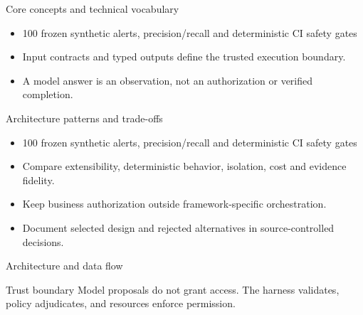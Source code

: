 \documentclass[aspectratio=169,10pt]{beamer}
\begin{document}
\begin{frame}{Core concepts and technical vocabulary}
\small
\begin{itemize}
\item 100 frozen synthetic alerts, precision/recall and deterministic CI safety gates
\item Input contracts and typed outputs define the trusted execution boundary.
\item A model answer is an observation, not an authorization or verified completion.
\end{itemize}

\end{frame}

\begin{frame}{Architecture patterns and trade-offs}
\small
\begin{itemize}
\item 100 frozen synthetic alerts, precision/recall and deterministic CI safety gates
\item Compare extensibility, deterministic behavior, isolation, cost and evidence fidelity.
\item Keep business authorization outside framework-specific orchestration.
\item Document selected design and rejected alternatives in source-controlled decisions.
\end{itemize}

\end{frame}

\begin{frame}{Architecture and data flow}
\small
\centering
{}
\vspace{0.6cm}
\begin{block}{Trust boundary}
Model proposals do not grant access. The harness validates, policy adjudicates, and resources enforce permission.
\end{block}
\end{frame}
\end{document}
